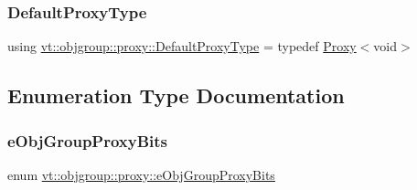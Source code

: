 \mbox{\label{namespacevt_1_1objgroup_1_1proxy_ac7e0a0acb3b31d5469a603de08192adc}} 
\subsubsection{\texorpdfstring{Default\+Proxy\+Type}{DefaultProxyType}}
{\footnotesize\ttfamily using \hyperlink{namespacevt_1_1objgroup_1_1proxy_ac7e0a0acb3b31d5469a603de08192adc}{vt\+::objgroup\+::proxy\+::\+Default\+Proxy\+Type} = typedef \hyperlink{structvt_1_1objgroup_1_1proxy_1_1_proxy}{Proxy}$<$void$>$}



\subsection{Enumeration Type Documentation}
\mbox{\label{namespacevt_1_1objgroup_1_1proxy_a5cfde1a666e49070fcc0312e51d53777}} 
\subsubsection{\texorpdfstring{e\+Obj\+Group\+Proxy\+Bits}{eObjGroupProxyBits}}
{\footnotesize\ttfamily enum \hyperlink{namespacevt_1_1objgroup_1_1proxy_a5cfde1a666e49070fcc0312e51d53777}{vt\+::objgroup\+::proxy\+::e\+Obj\+Group\+Proxy\+Bits}}

